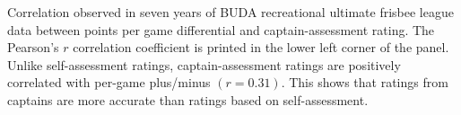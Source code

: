 Correlation observed in seven years of BUDA recreational ultimate frisbee league data between points per game differential and captain-assessment rating.  The Pearson's $r$ correlation coefficient is printed in the lower left corner of the panel. Unlike self-assessment ratings, captain-assessment ratings are positively correlated with per-game plus/minus $(r = 0.31)$. This shows that ratings from captains are more accurate than ratings based on self-assessment. \label{fig:correlation_captain}